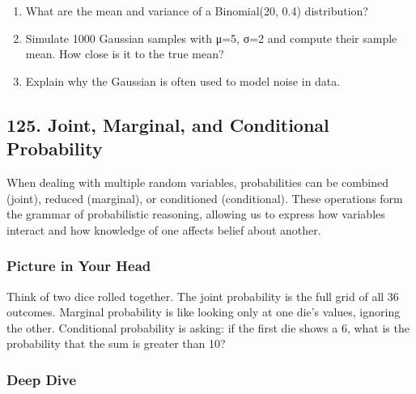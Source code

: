 \documentclass[
  letterpaper,
  DIV=11,
  numbers=noendperiod]{scrreprt}
\providecommand{\tightlist}{%
  \setlength{\itemsep}{0pt}\setlength{\parskip}{0pt}}
\begin{document}
\begin{enumerate}
\def\labelenumi{\arabic{enumi}.}
\tightlist
\item
  What are the mean and variance of a Binomial(20, 0.4) distribution?
\item
  Simulate 1000 Gaussian samples with μ=5, σ=2 and compute their sample
  mean. How close is it to the true mean?
\item
  Explain why the Gaussian is often used to model noise in data.
\end{enumerate}

\subsection{125. Joint, Marginal, and Conditional
Probability}\label{joint-marginal-and-conditional-probability}

When dealing with multiple random variables, probabilities can be
combined (joint), reduced (marginal), or conditioned (conditional).
These operations form the grammar of probabilistic reasoning, allowing
us to express how variables interact and how knowledge of one affects
belief about another.

\subsubsection{Picture in Your Head}\label{picture-in-your-head-124}

Think of two dice rolled together. The joint probability is the full
grid of all 36 outcomes. Marginal probability is like looking only at
one die's values, ignoring the other. Conditional probability is asking:
if the first die shows a 6, what is the probability that the sum is
greater than 10?

\subsubsection{Deep Dive}\label{deep-dive-124}
\end{document}
